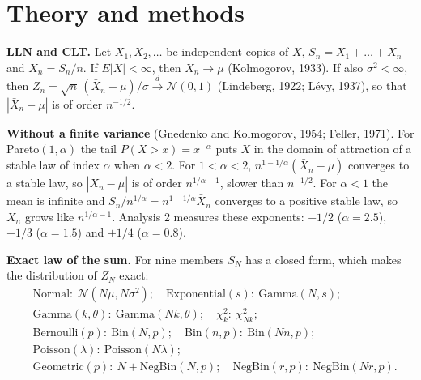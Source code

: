 \documentclass[11pt,a4paper]{article}
\begin{document}
\section{Theory and methods}

\textbf{LLN and CLT.} Let $X_1, X_2, \dots$ be independent copies of $X$, $S_n = X_1 + \dots + X_n$ and $\bar X_n = S_n/n$. If
$E|X| < \infty$, then $\bar X_n \to \mu$ (Kolmogorov, 1933). If also $\sigma^2 < \infty$, then
$Z_n = \sqrt{n}\,(\bar X_n - \mu)/\sigma \xrightarrow{d} \mathcal N(0,1)$ (Lindeberg, 1922; Lévy, 1937), so that
$|\bar X_n - \mu|$ is of order $n^{-1/2}$.

\textbf{Without a finite variance} (Gnedenko and Kolmogorov, 1954; Feller, 1971). For Pareto$(1,\alpha)$ the tail
$P(X > x) = x^{-\alpha}$ puts $X$ in the domain of attraction of a stable law of index $\alpha$ when $\alpha < 2$. For
$1 < \alpha < 2$, $n^{1-1/\alpha}(\bar X_n - \mu)$ converges to a stable law, so $|\bar X_n - \mu|$ is of order
$n^{1/\alpha - 1}$, slower than $n^{-1/2}$. For $\alpha < 1$ the mean is infinite and $S_n/n^{1/\alpha} = n^{1-1/\alpha}\bar X_n$
converges to a positive stable law, so $\bar X_n$ grows like $n^{1/\alpha - 1}$. Analysis 2 measures these exponents:
$-1/2$ ($\alpha = 2.5$), $-1/3$ ($\alpha = 1.5$) and $+1/4$ ($\alpha = 0.8$).

\textbf{Exact law of the sum.} For nine members $S_N$ has a closed form, which makes the distribution of $Z_N$ exact:
\begin{equation}
\begin{aligned}
&\text{Normal}: \ \mathcal N(N\mu, N\sigma^2); \quad \text{Exponential}(s): \ \text{Gamma}(N, s); \\
&\text{Gamma}(k,\theta): \ \text{Gamma}(Nk, \theta); \quad \chi^2_k: \ \chi^2_{Nk}; \\
&\text{Bernoulli}(p): \ \text{Bin}(N, p); \quad \text{Bin}(n,p): \ \text{Bin}(Nn, p); \\
&\text{Poisson}(\lambda): \ \text{Poisson}(N\lambda); \\
&\text{Geometric}(p): \ N + \text{NegBin}(N, p); \quad \text{NegBin}(r,p): \ \text{NegBin}(Nr, p).
\end{aligned}\label{eq:sums}
\end{equation}
\end{document}
